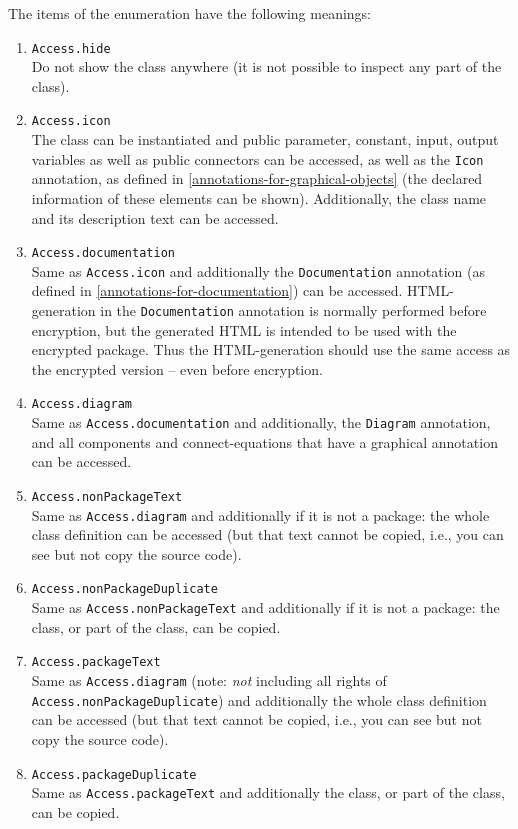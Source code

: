 The items of the  enumeration have the following meanings:
\begin{enumerate}
\item
  \lstinline!Access.hide!\\
  Do not show the class anywhere (it is not possible to inspect any part
  of the class).
\item
  \lstinline!Access.icon!\\
  The class can be instantiated and public parameter, constant, input, output variables as well as public connectors can be accessed, as well as the \lstinline!Icon! annotation, as defined in \cref{annotations-for-graphical-objects} (the declared information of these elements can be shown).  Additionally, the class name and its description text can be accessed.
\item
  \lstinline!Access.documentation!\\
  Same as \lstinline!Access.icon! and additionally the \lstinline!Documentation! annotation (as defined in \cref{annotations-for-documentation}) can be accessed.  HTML-generation in the \lstinline!Documentation! annotation is normally performed before encryption, but the generated HTML is intended to be used with the encrypted package.  Thus the HTML-generation should use the same access as the encrypted version -- even before encryption.
\item
  \lstinline!Access.diagram!\\
  Same as \lstinline!Access.documentation! and additionally, the \lstinline!Diagram! annotation, and all components and connect-equations that have a graphical annotation can be accessed.
\item
  \lstinline!Access.nonPackageText!\\
  Same as \lstinline!Access.diagram! and additionally if it is not a package: the whole class definition can be accessed (but that text cannot be copied, i.e., you can see but not copy the source code).
\item
  \lstinline!Access.nonPackageDuplicate!\\
  Same as \lstinline!Access.nonPackageText! and additionally if it is not a package: the class, or part of the class, can be copied.
\item
  \lstinline!Access.packageText!\\
  Same as \lstinline!Access.diagram! (note: \emph{not} including all rights of \lstinline!Access.nonPackageDuplicate!) and additionally the whole class definition can be accessed (but that text cannot be copied, i.e., you can see but not copy the source code).
\item
  \lstinline!Access.packageDuplicate!\\
  Same as \lstinline!Access.packageText! and additionally the class, or part of the class, can be copied.
\end{enumerate}

